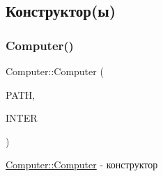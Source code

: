 \subsection{Конструктор(ы)}
\hypertarget{class_computer_ae13c32fa07ad956f0c229608dab5e332}{}\label{class_computer_ae13c32fa07ad956f0c229608dab5e332} 
\subsubsection{\texorpdfstring{Computer()}{Computer()}}
{\footnotesize\ttfamily Computer\+::\+Computer (\begin{DoxyParamCaption}\item[{Q\+String}]{P\+A\+TH,  }\item[{\hyperlink{classinterpreter}{interpreter} $\ast$}]{I\+N\+T\+ER }\end{DoxyParamCaption})}



\hyperlink{class_computer_ae13c32fa07ad956f0c229608dab5e332}{Computer\+::\+Computer} -\/ конструктор 


